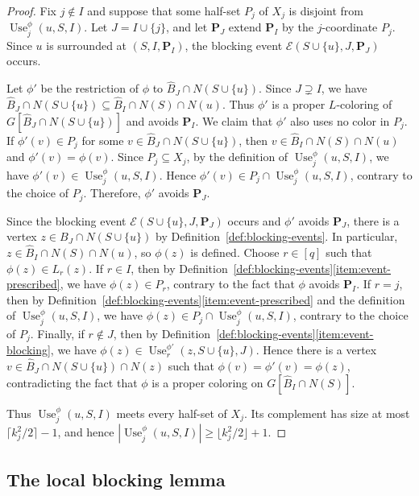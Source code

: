 \documentclass[10pt,a4paper]{amsart}
\numberwithin{equation}{section}
\newcommand{\Use}{\operatorname{Use}}
\begin{document}
\begin{proof}
Fix $j \notin I$ and suppose that some half-set $P_j$ of $X_j$ is disjoint
from $\Use_j^\phi(u, S, I)$. Let $J = I \cup \{j\}$, and let $\mathbf{P}_J$
extend $\mathbf{P}_I$ by the $j$-coordinate $P_j$.
Since $u$ is surrounded at $(S,I,\mathbf{P}_I)$, the blocking event
$\mathcal{E}(S \cup \{u\},J,\mathbf{P}_J)$ occurs.

Let $\phi'$ be the restriction
of $\phi$ to $\hat{B}_{J} \cap N(S \cup \{u\})$. Since $J \supsetneq I$, we have
$\hat{B}_{J} \cap N(S \cup \{u\})
 \subseteq \hat{B}_{I} \cap N(S) \cap N(u)$. Thus $\phi'$ is a proper
$L$-coloring of $G[\hat{B}_{J} \cap N(S \cup \{u\})]$ and avoids
$\mathbf{P}_I$. We claim that $\phi'$ also uses no color in $P_j$. If
$\phi'(v) \in P_j$ for some
$v \in \hat{B}_{J} \cap N(S \cup \{u\})$, then
$v \in \hat{B}_{I} \cap N(S) \cap N(u)$ and $\phi'(v) = \phi(v)$. Since
$P_j \subseteq X_j$, by the definition of $\Use_j^\phi(u, S, I)$, we have
$\phi'(v) \in \Use_j^\phi(u, S, I)$. Hence
$\phi'(v) \in P_j \cap \Use_j^\phi(u, S, I)$, contrary to the choice of $P_j$.
Therefore, $\phi'$ avoids $\mathbf{P}_J$.

Since the blocking event $\mathcal{E}(S \cup \{u\},J,\mathbf{P}_J)$ occurs and
$\phi'$ avoids $\mathbf{P}_J$, there is a vertex
$z \in B_J \cap N(S \cup \{u\})$ by
Definition~\ref{def:blocking-events}. In particular,
$z \in \hat{B}_{I} \cap N(S) \cap N(u)$, so $\phi(z)$ is defined. Choose
$r \in [q]$ such that $\phi(z) \in L_r(z)$. If $r \in I$, then by
Definition~\ref{def:blocking-events}\ref{item:event-prescribed}, we have
$\phi(z) \in P_r$, contrary to the fact that $\phi$ avoids $\mathbf{P}_I$.
If $r = j$, then by
Definition~\ref{def:blocking-events}\ref{item:event-prescribed} and the definition of
$\Use_j^\phi(u, S, I)$, we have
$\phi(z) \in P_j \cap \Use_j^\phi(u, S, I)$, contrary to the choice of $P_j$.
Finally, if $r \notin J$, then by
Definition~\ref{def:blocking-events}\ref{item:event-blocking}, we have
$\phi(z) \in \Use_r^{\phi'}(z, S \cup \{u\}, J)$. Hence there is a vertex
$v \in \hat{B}_{J} \cap N(S \cup \{u\}) \cap N(z)$ such that
$\phi(v) = \phi'(v) = \phi(z)$, contradicting the fact that $\phi$ is a proper coloring on $G[\hat{B}_{I} \cap N(S)]$.

Thus $\Use_j^\phi(u, S, I)$ meets every
half-set of $X_j$. Its complement has size at most
$\lceil k_j^2/2\rceil - 1$, and hence
$|\Use_j^\phi(u, S, I)| \geq \lfloor k_j^2/2\rfloor + 1$.
\end{proof}
 

\subsection{The local blocking lemma}\label{subsec:local-blocking}
\end{document}

